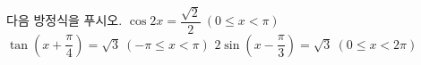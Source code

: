 다음 방정식을 푸시오.
 $\cos 2x=\dfrac{\sqrt{2}}{2}\ (0\le x<\pi)$
 $\tan\left(x+\dfrac{\pi}{4}\right)=\sqrt{3}\ (-\pi\le x<\pi)$
 $2\sin\left(x-\dfrac{\pi}{3}\right)=\sqrt{3}\ (0\le x<2\pi)$
